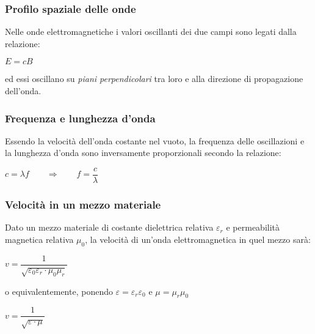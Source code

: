 \documentclass[]{beamer}
\theoremstyle{plain}
\begin{document}
\begin{frame}
  \frametitle{Profilo spaziale delle onde}
  Nelle onde elettromagnetiche i valori oscillanti dei due campi sono legati dalla relazione:
  \begin{center}
  $ E = cB $
  \end{center}
  ed essi oscillano su \emph{piani perpendicolari} tra loro e alla direzione di propagazione dell'onda.\pause
  \begin{figure}
  \end{figure}
\end{frame}

\begin{frame}
  \frametitle{Frequenza e lunghezza d'onda}
  Essendo la velocità dell'onda costante nel vuoto, la frequenza delle oscillazioni e la lunghezza d'onda sono inversamente proporzionali secondo la relazione:
   \begin{center}
   $ c = \lambda f \qquad \Longrightarrow \qquad $\colorbox{blue!30}{$ f = \dfrac{c}{\lambda} $}
   \end{center}
\end{frame}


\begin{frame}
\frametitle{Velocità in un mezzo materiale}
  Dato un mezzo materiale di costante dielettrica relativa $ \varepsilon_r $ e permeabilità magnetica relativa $ \mu_0 $, la velocità di un'onda elettromagnetica in quel mezzo sarà:
  \begin{center}
    \colorbox{blue!30}{$ v = \dfrac{1}{\sqrt{\varepsilon_0 \varepsilon_r \cdot \mu_0 \mu_r}} $}
  \end{center}
  o equivalentemente, ponendo $ \varepsilon = \varepsilon_r \varepsilon_0 $ e $ \mu = \mu_r \mu_0 $
  \begin{center}
    \colorbox{blue!30}{$ v = \dfrac{1}{\sqrt{\varepsilon \cdot \mu}} $}
  \end{center}
\end{frame}
\end{document}
